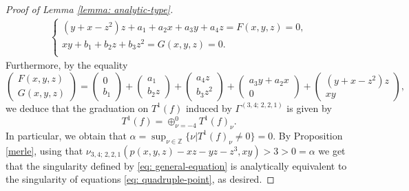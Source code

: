 \documentclass[plain]{amsart}
\begin{document}
\begin{proof}[Proof of Lemma \ref{lemma: analytic-type}]
\begin{eqnarray}
\left\{\begin{array}{l}
(y+x-z^2)z+a_1+a_2x+a_3y+a_4z=F(x,y,z)=0,\\
xy+b_1+b_2z+b_3z^2=G(x,y,z)=0. \\
\end{array}\right.
\end{eqnarray}
Furthermore, by the equality
$$
\begin{pmatrix}F(x,y,z)\\ G(x,y,z)
\end{pmatrix}=\begin{pmatrix}0\\b_1
\end{pmatrix}+\begin{pmatrix}a_1\\ b_2z
\end{pmatrix}+
\begin{pmatrix}a_4z\\b_3z^2
\end{pmatrix}+\begin{pmatrix}a_3y+a_2x\\ 0
\end{pmatrix}+\begin{pmatrix}(y+x-z^2)z\\ xy
\end{pmatrix},
$$ we deduce that the graduation on $T^1(f)$
 induced by $\Gamma^{(3,4;\,2,2,1)}$ is given by
 $$
 T^1(f)=\oplus_{\nu=-4}^0 T^1(f)_\nu.
 $$ 
In particular, we obtain that $\alpha=\sup_{\nu\in\mathbb Z}\{\nu | T^1(f)_\nu\neq 0\}=0.$
 By Proposition \ref{merle}, using that $\nu_{3,4;\,2,2,1}(p(x,y,z)-xz-yz-z^3, xy)>3>0=\alpha$
 we get that the singularity defined by \eqref{eq: general-equation} is analytically 
 equivalent to the singularity of equations \eqref{eq: quadruple-point}, as
 desired. 
\end{proof}
\end{document}
